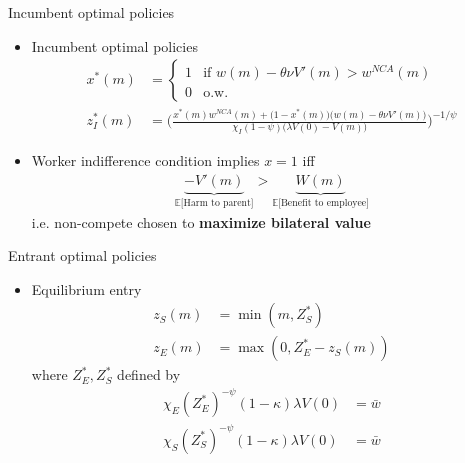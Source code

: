 \documentclass[english,usenames,dvipsnames]{beamer}
\begin{document}
\begin{frame}{Incumbent optimal policies}
\begin{itemize}
\item Incumbent optimal policies
\small
\begin{align*}
x^*(m) &= 
\begin{cases}
1 & \textrm{if } w(m) - \theta \nu V'(m) > w^{NCA}(m) \\
0 & \textrm{o.w.}
\end{cases}\\ 
z_I^*(m) &= \Bigg( \frac{x^*(m) w^{NCA}(m) + \Big(1-x^*(m)\Big) \Big(w(m) - \theta \nu V'(m)\Big)}{\chi_I (1-\psi) \Big(\lambda V(0) - V(m) \Big)} \Bigg)^{-1/\psi} 
\end{align*}
\normalsize
\item Worker indifference condition implies $x = 1$ iff
\begin{align*}
\underbrace{- V'(m)}_{\textrm{$\mathbb{E}$[Harm to parent]}} > \underbrace{W(m)}_{\textrm{$\mathbb{E}$[Benefit to employee]}}  
\end{align*}
i.e. non-compete chosen to \textbf{\alert{maximize bilateral value}}
\end{itemize}
\end{frame}


\begin{frame}{Entrant optimal policies}
\begin{itemize}
\item Equilibrium entry
\begin{align*}
z_S(m) &= \min(m,Z_S^*) \\
z_E(m) &= \max(0, Z_E^* - z_S(m))
\end{align*} 
where $Z_E^*,Z_S^*$ defined by
\begin{align*}
\chi_E (Z_E^*)^{-\psi} (1-\kappa) \lambda V(0) &= \bar{w} \\
\chi_S (Z_S^*)^{-\psi} (1-\kappa) \lambda V(0) &= \bar{w} 
\end{align*}
\end{itemize}
\end{frame}
\end{document}
